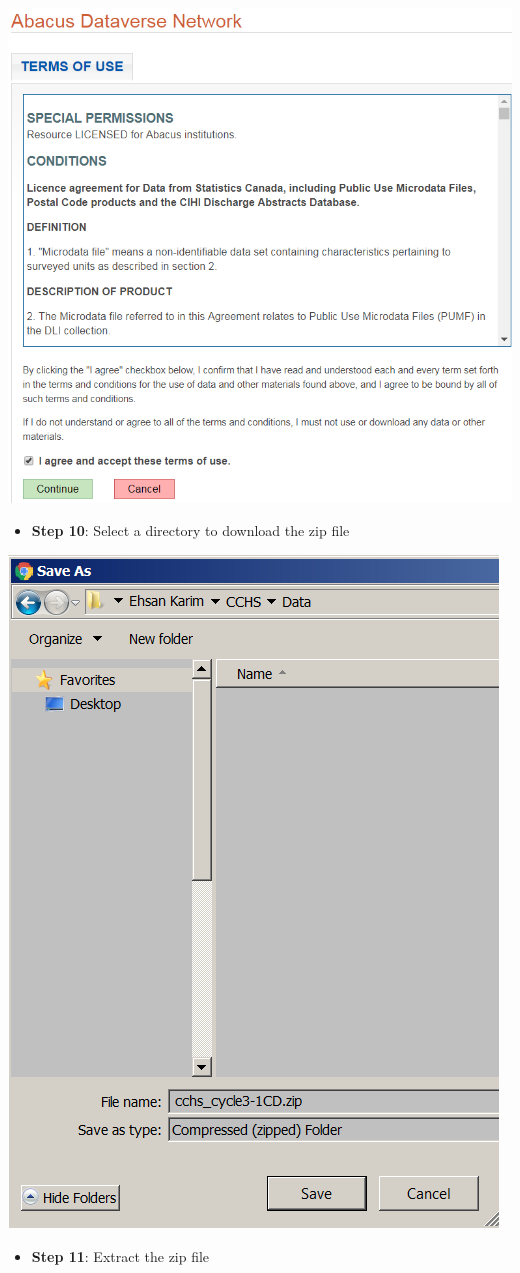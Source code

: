 \documentclass[
]{book}
\providecommand{\tightlist}{%
  \setlength{\itemsep}{0pt}\setlength{\parskip}{0pt}}
\begin{document}
\includegraphics[width=0.65\linewidth]{images/abacus9}

\begin{itemize}
\tightlist
\item
  \textbf{Step 10}: Select a directory to download the zip file
\end{itemize}

\includegraphics[width=0.65\linewidth]{images/abacus10}

\begin{itemize}
\tightlist
\item
  \textbf{Step 11}: Extract the zip file
\end{itemize}
\end{document}
